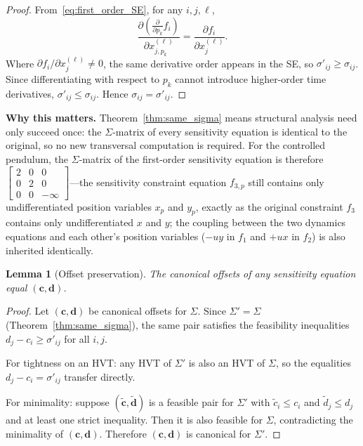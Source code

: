 \documentclass[12pt,a4paper]{article}
\theoremstyle{definition}
\theoremstyle{plain}
\newtheorem{lemma}[theorem]{Lemma}
\theoremstyle{remark}
\newcommand{\vc}{\mathbf{c}}
\newcommand{\vd}{\mathbf{d}}
\begin{document}
\begin{proof}
From~\eqref{eq:first_order_SE}, for any $i,j,\ell$,
\[
  \frac{\partial (\frac{\partial}{\partial p_k} f_i)}{\partial x_{j,p_k}^{(\ell)}}
  = \frac{\partial f_i}{\partial x_j^{(\ell)}} .
\]
Where $\partial f_i/\partial x_j^{(\ell)} \neq 0$, the same derivative order appears in the SE, so $\sigma'_{ij} \ge \sigma_{ij}$. Since differentiating with respect to $p_k$ cannot introduce higher-order time derivatives, $\sigma'_{ij} \le \sigma_{ij}$. Hence $\sigma_{ij} = \sigma'_{ij}$.
\end{proof}

\smallskip\noindent
\textbf{Why this matters.} Theorem~\ref{thm:same_sigma} means structural analysis need only succeed once: the $\Sigma$-matrix of every sensitivity equation is identical to the original, so no new transversal computation is required. For the controlled pendulum, the $\Sigma$-matrix of the first-order sensitivity equation is therefore $\left[\begin{smallmatrix}2&0&0\\0&2&0\\0&0&-\infty\end{smallmatrix}\right]$---the sensitivity constraint equation $f_{3,p}$ still contains only undifferentiated position variables $x_p$ and $y_p$, exactly as the original constraint $f_3$ contains only undifferentiated $x$ and $y$; the coupling between the two dynamics equations and each other's position variables ($-uy$ in $f_1$ and $+ux$ in $f_2$) is also inherited identically.

\begin{lemma}[Offset preservation]
\label{lem:offsets}
The canonical offsets of any sensitivity equation equal $(\vc,\vd)$.
\end{lemma}

\begin{proof}
Let $(\vc,\vd)$ be canonical offsets for $\Sigma$. Since $\Sigma'=\Sigma$ (Theorem~\ref{thm:same_sigma}), the same pair satisfies the feasibility inequalities $d_j - c_i \ge \sigma'_{ij}$ for all $i,j$.

For tightness on an HVT: any HVT of $\Sigma'$ is also an HVT of $\Sigma$, so the equalities $d_j - c_i = \sigma'_{ij}$ transfer directly.

For minimality: suppose $(\tilde{\vc},\tilde{\vd})$ is a feasible pair for $\Sigma'$ with $\tilde{c}_i \le c_i$ and $\tilde{d}_j \le d_j$ and at least one strict inequality. Then it is also feasible for $\Sigma$, contradicting the minimality of $(\vc,\vd)$. Therefore $(\vc,\vd)$ is canonical for $\Sigma'$.
\end{proof}
\end{document}
